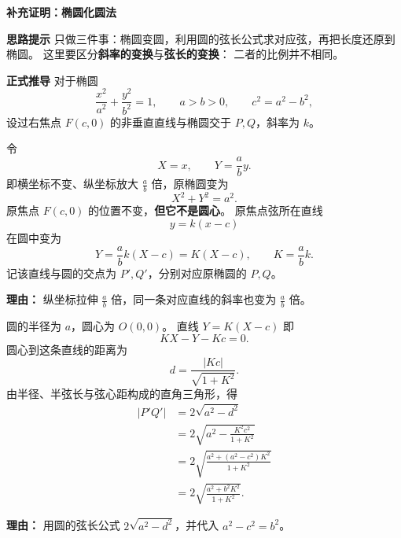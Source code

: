 \begin{proofbox}
    \textbf{\textcolor{CProof}{补充证明：椭圆化圆法}}

    \textbf{\textcolor{CProof}{思路提示}}
    只做三件事：椭圆变圆，利用圆的弦长公式求对应弦，再把长度还原到椭圆。
    这里要区分\textbf{斜率的变换}与\textbf{弦长的变换}：
    二者的比例并不相同。

    \medskip

    \textbf{\textcolor{CProof}{正式推导}}
    对于椭圆
    \[
        \frac{x^2}{a^2}+\frac{y^2}{b^2}=1,
        \qquad a>b>0,\qquad c^2=a^2-b^2,
    \]
    设过右焦点 $F(c,0)$ 的非垂直直线与椭圆交于 $P,Q$，斜率为 $k$。

    \begin{description}[style=nextline, leftmargin=2.8em, labelsep=0.5em, itemsep=0.55em]
        \item[\textbf{步骤一（椭圆化圆，得到新斜率）：}]
              令
              \[
                  X=x,\qquad Y=\frac ab y.
              \]
              即横坐标不变、纵坐标放大 $\frac ab$ 倍，原椭圆变为
              \[
                  X^2+Y^2=a^2.
              \]
              原焦点 $F(c,0)$ 的位置不变，\textbf{但它不是圆心}。
              原焦点弦所在直线
              \[
                  y=k(x-c)
              \]
              在圆中变为
              \[
                  Y=\frac ab k(X-c)=K(X-c),
                  \qquad \boxed{K=\frac ab k}.
              \]
              记该直线与圆的交点为 $P',Q'$，分别对应原椭圆的 $P,Q$。
              \par\textbf{理由：}
              纵坐标拉伸 $\frac ab$ 倍，同一条对应直线的斜率也变为 $\frac ab$ 倍。

        \item[\textbf{步骤二（在圆中求弦长）：}]
              圆的半径为 $a$，圆心为 $O(0,0)$。
              直线 $Y=K(X-c)$ 即
              \[
                  KX-Y-Kc=0.
              \]
              圆心到这条直线的距离为
              \[
                  d=\frac{|Kc|}{\sqrt{1+K^2}}.
              \]
              由半径、半弦长与弦心距构成的直角三角形，得
              \[
                  \begin{aligned}
                      |P'Q'|
                       &=2\sqrt{a^2-d^2}\\[0.3em]
                       &=2\sqrt{a^2-\frac{K^2c^2}{1+K^2}}\\[0.3em]
                       &=2\sqrt{\frac{a^2+(a^2-c^2)K^2}{1+K^2}}\\[0.3em]
                       &=\boxed{2\sqrt{\frac{a^2+b^2K^2}{1+K^2}}}.
                  \end{aligned}
              \]
              \par\textbf{理由：}
              用圆的弦长公式 $2\sqrt{a^2-d^2}$，并代入 $a^2-c^2=b^2$。


\end{description}
\end{proofbox}
